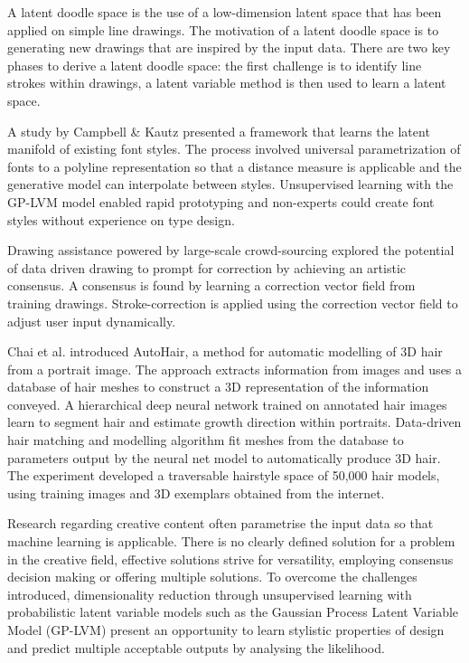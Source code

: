 \documentclass[ %
author={Dillon Keith Diep},
supervisor={Dr. Carl Henrik Ek},
degree={MEng},
title={ART-CG:},
subtitle={Assisted Real-time Content Generation of 3D Hair by Learning Manifolds},
type={Research},
year={2017} ]{dissertation}
\begin{document}
A latent doodle space is the use of a low-dimension latent space that has been applied on simple line drawings\cite{latentdoodle}. The motivation of a latent doodle space is to generating new drawings that are inspired by the input data. There are two key phases to derive a latent doodle space: the first challenge is to identify line strokes within drawings, a latent variable method is then used to learn a latent space.

A study by Campbell \& Kautz presented a framework that learns the latent manifold of existing font styles\cite{fontmanifold}. The process involved universal parametrization of fonts to a polyline representation so that a distance measure is applicable and the generative model can interpolate between styles. Unsupervised learning with the GP-LVM model enabled rapid prototyping and non-experts could create font styles without experience on type design.

Drawing assistance powered by large-scale crowd-sourcing explored the potential of data driven drawing to prompt for correction by achieving an artistic consensus\cite{drawingassistance}. A consensus is found by learning a correction vector field from training drawings. Stroke-correction is applied using the correction vector field to adjust user input dynamically.

Chai et al. introduced AutoHair, a method for automatic modelling of 3D hair from a portrait image\cite{autohair}. The approach extracts information from images and uses a database of hair meshes to construct a 3D representation of the information conveyed. A hierarchical deep neural network trained on annotated hair images learn to segment hair and estimate growth direction within portraits. Data-driven hair matching and modelling algorithm fit meshes from the database to parameters output by the neural net model to automatically produce 3D hair. The experiment developed a traversable hairstyle space of 50,000 hair models, using training images and 3D exemplars obtained from the internet.

Research regarding creative content often parametrise the input data so that machine learning is applicable. There is no clearly defined solution for a problem in the creative field, effective solutions strive for versatility, employing consensus decision making or offering multiple solutions. To overcome the challenges introduced, dimensionality reduction through unsupervised learning with probabilistic latent variable models such as the Gaussian Process Latent Variable Model (GP-LVM) \cite{gplvm} present an opportunity to learn stylistic properties of design and predict multiple acceptable outputs by analysing the likelihood.
\end{document}
